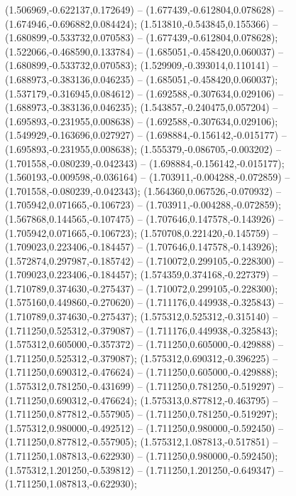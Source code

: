  (1.506969,-0.622137,0.172649) -- (1.677439,-0.612804,0.078628) -- (1.674946,-0.696882,0.084424);
 (1.513810,-0.543845,0.155366) -- (1.680899,-0.533732,0.070583) -- (1.677439,-0.612804,0.078628);
 (1.522066,-0.468590,0.133784) -- (1.685051,-0.458420,0.060037) -- (1.680899,-0.533732,0.070583);
 (1.529909,-0.393014,0.110141) -- (1.688973,-0.383136,0.046235) -- (1.685051,-0.458420,0.060037);
 (1.537179,-0.316945,0.084612) -- (1.692588,-0.307634,0.029106) -- (1.688973,-0.383136,0.046235);
 (1.543857,-0.240475,0.057204) -- (1.695893,-0.231955,0.008638) -- (1.692588,-0.307634,0.029106);
 (1.549929,-0.163696,0.027927) -- (1.698884,-0.156142,-0.015177) -- (1.695893,-0.231955,0.008638);
 (1.555379,-0.086705,-0.003202) -- (1.701558,-0.080239,-0.042343) -- (1.698884,-0.156142,-0.015177);
 (1.560193,-0.009598,-0.036164) -- (1.703911,-0.004288,-0.072859) -- (1.701558,-0.080239,-0.042343);
 (1.564360,0.067526,-0.070932) -- (1.705942,0.071665,-0.106723) -- (1.703911,-0.004288,-0.072859);
 (1.567868,0.144565,-0.107475) -- (1.707646,0.147578,-0.143926) -- (1.705942,0.071665,-0.106723);
 (1.570708,0.221420,-0.145759) -- (1.709023,0.223406,-0.184457) -- (1.707646,0.147578,-0.143926);
 (1.572874,0.297987,-0.185742) -- (1.710072,0.299105,-0.228300) -- (1.709023,0.223406,-0.184457);
 (1.574359,0.374168,-0.227379) -- (1.710789,0.374630,-0.275437) -- (1.710072,0.299105,-0.228300);
 (1.575160,0.449860,-0.270620) -- (1.711176,0.449938,-0.325843) -- (1.710789,0.374630,-0.275437);
 (1.575312,0.525312,-0.315140) -- (1.711250,0.525312,-0.379087) -- (1.711176,0.449938,-0.325843);
 (1.575312,0.605000,-0.357372) -- (1.711250,0.605000,-0.429888) -- (1.711250,0.525312,-0.379087);
 (1.575312,0.690312,-0.396225) -- (1.711250,0.690312,-0.476624) -- (1.711250,0.605000,-0.429888);
 (1.575312,0.781250,-0.431699) -- (1.711250,0.781250,-0.519297) -- (1.711250,0.690312,-0.476624);
 (1.575313,0.877812,-0.463795) -- (1.711250,0.877812,-0.557905) -- (1.711250,0.781250,-0.519297);
 (1.575312,0.980000,-0.492512) -- (1.711250,0.980000,-0.592450) -- (1.711250,0.877812,-0.557905);
 (1.575312,1.087813,-0.517851) -- (1.711250,1.087813,-0.622930) -- (1.711250,0.980000,-0.592450);
 (1.575312,1.201250,-0.539812) -- (1.711250,1.201250,-0.649347) -- (1.711250,1.087813,-0.622930);

